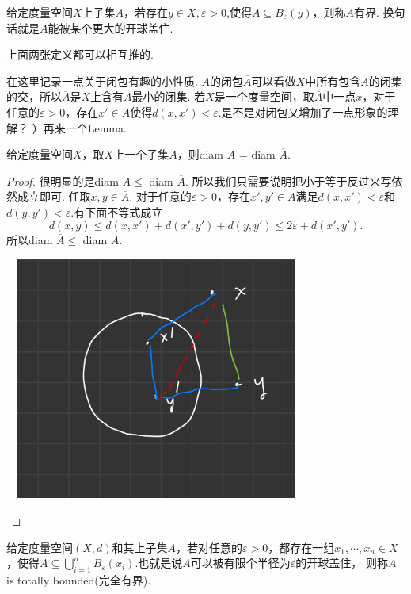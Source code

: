 \begin{definition}
给定度量空间$X$上子集$A$，若存在$y \in X, \varepsilon >0$,使得$A \subseteq B_\varepsilon(y)$，则称$A$有界. 换句话就是$A$能被某个更大的开球盖住.
\end{definition}

上面两张定义都可以相互推的.

在这里记录一点关于闭包有趣的小性质. $A$的闭包$\overline{A}$可以看做$X$中所有包含$A$的闭集的交，所以$\overline{A}$是$X$上含有$A$最小的闭集. 若$X$是一个度量空间，取$\overline{A}$中一点$x$，对于任意的$\varepsilon >0$，存在$x' \in A$使得$d(x,x') < \varepsilon$.是不是对闭包又增加了一点形象的理解？ ）再来一个Lemma.

\begin{lemma}
给定度量空间$X$，取$X$上一个子集$A$，则diam $A$ = diam $\overline{A}$.
\end{lemma}

\begin{proof}
很明显的是diam $A \leq$ diam $\overline{A}$. 所以我们只需要说明把小于等于反过来写依然成立即可. 任取$x,y \in \overline{A}$. 对于任意的$\varepsilon > 0 $，存在$x',y' \in A$满足$d(x,x') < \varepsilon$和$d(y,y') < \varepsilon$.有下面不等式成立\[d(x,y)\leq d(x,x')+d(x',y')+d(y,y') \leq 2\varepsilon + d(x',y').\]所以diam $\overline{A} \leq$ diam $A$.

\begin{center}
\includegraphics[width=10cm, height=8cm]{images/diam_closure.jpg}
\end{center}
\end{proof}

\begin{definition}
给定度量空间$(X,d)$和其上子集$A$，若对任意的$\varepsilon > 0$，都存在一组$x_1,\cdots,x_n \in X$，使得$A \subseteq \bigcup\limits_{i=1}^{n} B_\varepsilon(x_i)$.也就是说$A$可以被有限个半径为$\varepsilon$的开球盖住， 则称$A$ is totally bounded(完全有界).
\end{definition}

